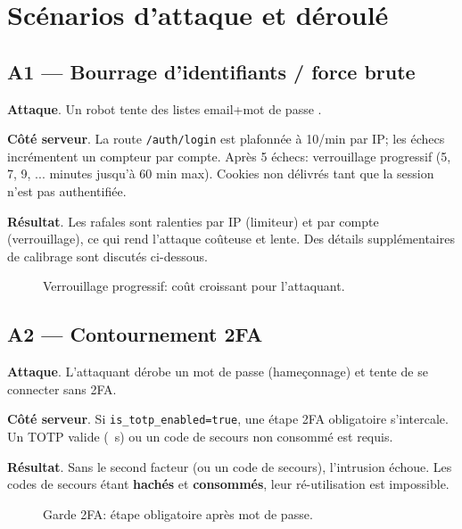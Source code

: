 \section{Scénarios d'attaque et déroulé}

\subsection*{A1 — Bourrage d'identifiants / force brute}
\textbf{Attaque}. Un robot tente des listes \og email+mot de passe \fg{}.

\textbf{Côté serveur}. La route \texttt{/auth/login} est plafonnée à 10/min par IP; les échecs incrémentent un compteur par compte. Après 5 échecs: verrouillage progressif (5, 7, 9, ... minutes jusqu'à 60 min max). Cookies non délivrés tant que la session n'est pas authentifiée.

\textbf{Résultat}. Les rafales sont ralenties par IP (limiteur) et par compte (verrouillage), ce qui rend l'attaque coûteuse et lente. Des détails supplémentaires de calibrage sont discutés ci-dessous.

\begin{figure}[h]
  \centering
  \caption{Verrouillage progressif: coût croissant pour l'attaquant.}
\end{figure}

\subsection*{A2 — Contournement 2FA}
\textbf{Attaque}. L'attaquant dérobe un mot de passe (hameçonnage) et tente de se connecter sans 2FA.

\textbf{Côté serveur}. Si \texttt{is\_totp\_enabled=true}, une étape 2FA obligatoire s'intercale. Un TOTP valide (~s) ou un code de secours non consommé est requis.

\textbf{Résultat}. Sans le second facteur (ou un code de secours), l'intrusion échoue. Les codes de secours étant \textbf{hachés} et \textbf{consommés}, leur ré-utilisation est impossible.

\begin{figure}[h]
  \centering
  \caption{Garde 2FA: étape obligatoire après mot de passe.}
\end{figure}

